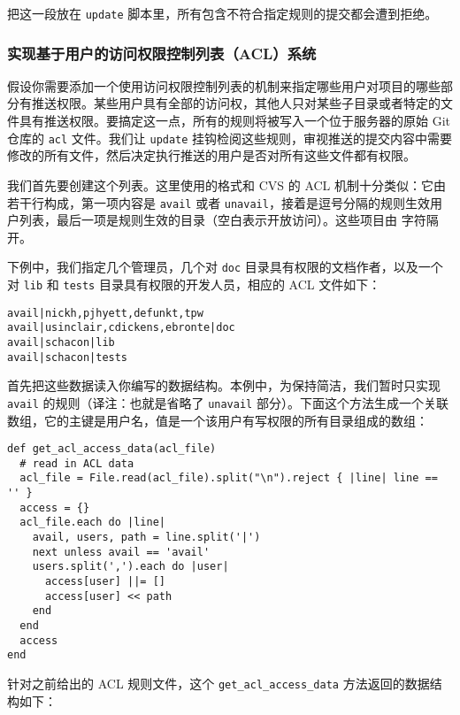 \documentclass[a4paper]{book}
\begin{document}
把这一段放在 \texttt{update} 脚本里，所有包含不符合指定规则的提交都会遭到拒绝。

\subsubsection{实现基于用户的访问权限控制列表（ACL）系统}

假设你需要添加一个使用访问权限控制列表的机制来指定哪些用户对项目的哪些部分有推送权限。某些用户具有全部的访问权，其他人只对某些子目录或者特定的文件具有推送权限。要搞定这一点，所有的规则将被写入一个位于服务器的原始 Git 仓库的 \texttt{acl} 文件。我们让 \texttt{update} 挂钩检阅这些规则，审视推送的提交内容中需要修改的所有文件，然后决定执行推送的用户是否对所有这些文件都有权限。

我们首先要创建这个列表。这里使用的格式和 CVS 的 ACL 机制十分类似：它由若干行构成，第一项内容是 \texttt{avail} 或者 \texttt{unavail}，接着是逗号分隔的规则生效用户列表，最后一项是规则生效的目录（空白表示开放访问）。这些项目由 \texttt{\textbar{}} 字符隔开。

下例中，我们指定几个管理员，几个对 \texttt{doc} 目录具有权限的文档作者，以及一个对 \texttt{lib} 和 \texttt{tests} 目录具有权限的开发人员，相应的 ACL 文件如下：

\begin{shaded}\begin{verbatim}
avail|nickh,pjhyett,defunkt,tpw
avail|usinclair,cdickens,ebronte|doc
avail|schacon|lib
avail|schacon|tests
\end{verbatim}\end{shaded}

首先把这些数据读入你编写的数据结构。本例中，为保持简洁，我们暂时只实现 \texttt{avail} 的规则（译注：也就是省略了 \texttt{unavail} 部分）。下面这个方法生成一个关联数组，它的主键是用户名，值是一个该用户有写权限的所有目录组成的数组：

\begin{shaded}\begin{verbatim}
def get_acl_access_data(acl_file)
  # read in ACL data
  acl_file = File.read(acl_file).split("\n").reject { |line| line == '' }
  access = {}
  acl_file.each do |line|
    avail, users, path = line.split('|')
    next unless avail == 'avail'
    users.split(',').each do |user|
      access[user] ||= []
      access[user] << path
    end
  end
  access
end
\end{verbatim}\end{shaded}

针对之前给出的 ACL 规则文件，这个 \texttt{get\_acl\_access\_data} 方法返回的数据结构如下：
\end{document}
